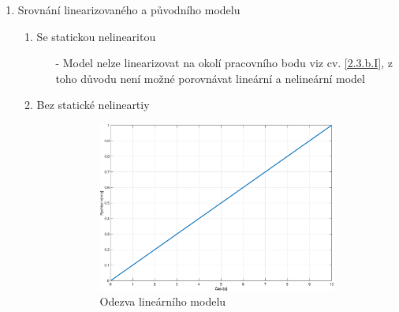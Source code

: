 \documentclass{article}
\begin{document}
\begin{enumerate}
\begin{enumerate}
            \item Srovnání linearizovaného a původního modelu
                \begin{enumerate}
                    \item Se statickou nelinearitou
                        \begin{itemize}
                            \item[-] Model nelze linearizovat na okolí pracovního bodu viz cv. \underline{\ref{2.3.b.I}}, z toho důvodu není možné porovnávat lineární a nelineární model
                        \end{itemize}

                    \newpage
                    
                    \item Bez statické nelineartiy\\
                        \begin{figure}[H]
                    	\centering
                    	\begin{subfigure}[b]{0.45\textwidth}
                    		\includegraphics[width=\textwidth]{Figures/Odezva_2_3_linearni.eps}
                    		\caption{Odezva lineárního modelu}
                    		\label{fig:LinearFig_23cII}
                    	\end{subfigure}
                    	~
                    	\begin{subfigure}[b]{0.45\textwidth}

\end{subfigure}
\end{figure}
\end{enumerate}
\end{enumerate}
\end{enumerate}
\end{document}
